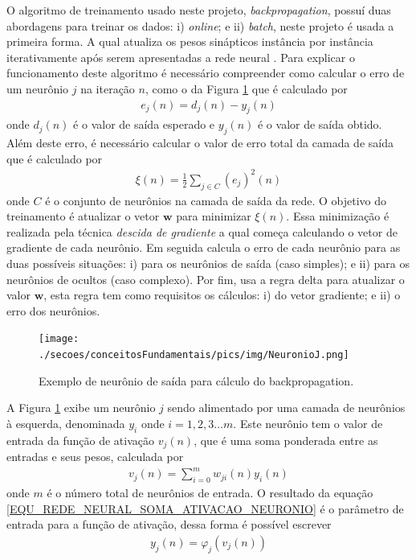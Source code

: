 O algoritmo de treinamento usado neste projeto, \emph{backpropagation}, possuí duas abordagens para treinar os dados: i) \emph{online}; e ii) \emph{batch}, neste projeto é usada a primeira forma. A qual atualiza os pesos sinápticos instância por instância iterativamente após serem apresentadas a rede neural \cite{Haykin2007}. Para explicar o funcionamento deste algoritmo é necessário compreender como calcular o erro de um neurônio \(j\) na iteração \(n\), como o da Figura \ref{FIGURA_REDE_NEURAL_NEURONIO_BACKPROPAGATION} que é calculado por
\begin{align}
e_{j}(n) = d_{j}(n) - y_{j}(n)	\label{EQU_REDE_NEURAL_ERRO_NEURONIO_J}
\end{align}
onde \(d_{j}(n)\) é o valor de saída esperado e \(y_{j}(n)\) é o valor de saída obtido. Além deste erro, é necessário calcular o valor de erro total da camada de saída que é calculado por
\begin{align}
\xi(n) = \frac{1}{2} \sum\limits_{j \in C} (e_{j})^{2}(n)	\label{EQU_REDE_NEURAL_ERRO_TODOS_OS_NEURONIOS_SAIDA}
\end{align}
onde \(C\) é o conjunto de neurônios na camada de saída da rede. O objetivo do treinamento é atualizar o vetor \(\mathbf{w}\) para minimizar \(\xi(n)\). Essa minimização é realizada pela técnica \emph{descida de gradiente} a qual começa calculando o vetor de gradiente de cada neurônio. Em seguida calcula o erro de cada neurônio para as duas possíveis situações: i) para os neurônios de saída (caso simples); e ii) para os neurônios de ocultos (caso complexo). Por fim, usa a regra delta para atualizar o valor \(\mathbf{w}\), esta regra tem como requisitos os cálculos: i) do vetor gradiente; e ii) o erro dos neurônios.
\begin{figure}[H]
	\centering
 	  \caption{Exemplo de neurônio de saída para cálculo do backpropagation.}
		\texttt{[image: ./secoes/conceitosFundamentais/pics/img/NeuronioJ.png]}
	\label{FIGURA_REDE_NEURAL_NEURONIO_BACKPROPAGATION}
\end{figure}
A Figura \ref{FIGURA_REDE_NEURAL_NEURONIO_BACKPROPAGATION} exibe um neurônio \(j\) sendo alimentado por uma camada de neurônios à esquerda, denominada \(y_{i}\) onde \(i = 1, 2, 3 \ldots m\). Este neurônio tem o valor de entrada da função de ativação \(v_{j}(n)\), que é uma soma ponderada entre as entradas e seus pesos, calculada por
\begin{align}
v_{j}(n) = \sum\limits_{i = 0}^{m} w_{ji}(n)y_{i}(n)\label{EQU_REDE_NEURAL_SOMA_ATIVACAO_NEURONIO}
\end{align}
onde \(m\) é o número total de neurônios de entrada. O resultado da equação \eqref{EQU_REDE_NEURAL_SOMA_ATIVACAO_NEURONIO} é o parâmetro de entrada para a função de ativação, dessa forma é possível escrever
\begin{align}
y_{j}(n) = \varphi_{j}(v_{j}(n)) \label{EQU_REDE_NEURAL_SAIDA_NEURONIO}
\end{align}

